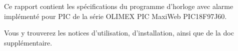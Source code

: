 Ce rapport contient les spécifications du programme d'horloge avec alarme implémenté pour PIC de la série OLIMEX PIC MaxiWeb PIC18F97J60.

Vous y trouverez les notices d'utilisation, d'installation, ainsi que de la doc supplémentaire.